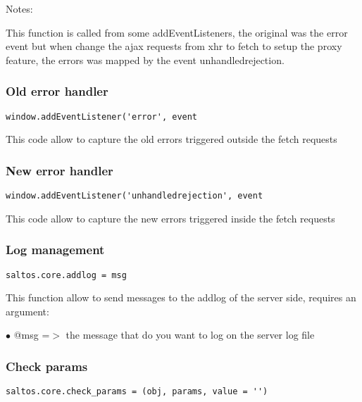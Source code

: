 \documentclass[a4paper]{article}
\begin{document}
Notes:

This function is called from some addEventListeners, the original was the error event
but when change the ajax requests from xhr to fetch to setup the proxy feature, the
errors was mapped by the event unhandledrejection.

\hypertarget{toc693}{}
\subsubsection{Old error handler}

\begin{lstlisting}
window.addEventListener('error', event
\end{lstlisting}

This code allow to capture the old errors triggered outside the fetch requests

\hypertarget{toc694}{}
\subsubsection{New error handler}

\begin{lstlisting}
window.addEventListener('unhandledrejection', event
\end{lstlisting}

This code allow to capture the new errors triggered inside the fetch requests

\hypertarget{toc695}{}
\subsubsection{Log management}

\begin{lstlisting}
saltos.core.addlog = msg
\end{lstlisting}

This function allow to send messages to the addlog of the server side, requires an argument:

\begin{compactitem}
\item[\color{myblue}$\bullet$] @msg =$>$ the message that do you want to log on the server log file
\end{compactitem}

\hypertarget{toc696}{}
\subsubsection{Check params}

\begin{lstlisting}
saltos.core.check_params = (obj, params, value = '')
\end{lstlisting}
\end{document}
